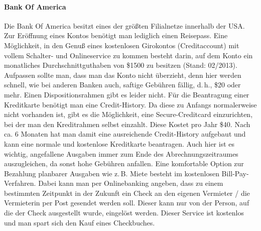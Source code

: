 \documentclass[a4paper]{scrreprt}
\begin{document}
\paragraph{Bank Of America}  %
Die Bank Of America besitzt eines der gr\"o\ss{}ten Filialnetze innerhalb der USA. Zur Er\"offnung eines Kontos ben\"otigt man lediglich einen Reisepass. Eine M\"oglichkeit, in den Genu\ss{} eines kostenlosen Girokontos (Creditaccount) mit vollem Schalter- und Onlineservice zu kommen besteht darin, auf dem Konto ein monatliches Durchschnittguthaben von \$1500 zu besitzen (Stand: 02/2013). Aufpassen sollte man, dass man das Konto nicht \"uberzieht, denn hier werden schnell, wie bei anderen Banken auch, saftige Geb\"uhren f\"allig, d.\,h., \$20  oder mehr. Einen Dispositionsrahmen gibt es leider nicht. F\"ur die Beantragung einer Kreditkarte ben\"otigt man eine Credit-History. Da diese zu Anfangs normalerweise nicht vorhanden ist, gibt es die M\"oglichkeit, eine Secure-Creditcard einzurichten, bei der man den Kreditrahmen selbst einzahlt. Diese Kostet pro Jahr \$40. Nach ca. 6 Monaten hat man damit eine ausreichende Credit-History aufgebaut und kann eine normale und kostenlose Kreditkarte beantragen. Auch hier ist es wichtig, angefallene Ausgaben immer zum Ende des Abrechnungszeitraumes auszugleichen, da sonst hohe Geb\"uhren anfallen.
Eine komfortable Option zur Bezahlung planbarer Ausgaben wie z.\,B. Miete besteht im kostenlosen Bill-Pay-Verfahren. Dabei kann man per Onlinebanking angeben, dass zu einem bestimmten Zeitpunkt in der Zukunft ein Check an den eigenen Vermieter / die Vermieterin per Post gesendet werden soll. Dieser kann nur von der Person, auf die der Check ausgestellt wurde, eingel\"ost werden. Dieser Service ist kostenlos und man spart sich den Kauf eines Checkbuches.

\end{document}
